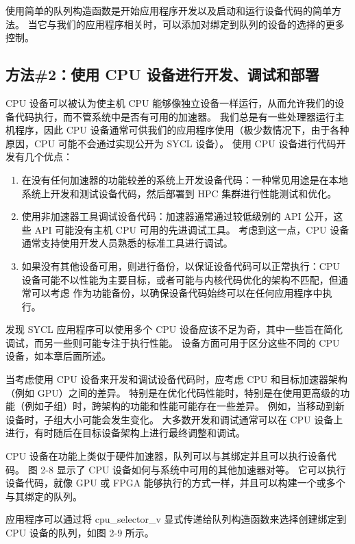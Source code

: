 使用简单的队列构造函数是开始应用程序开发以及启动和运行设备代码的简单方法。 当它与我们的应用程序相关时，可以添加对绑定到队列的设备的选择的更多控制。

\subsection{方法\#2：使用 CPU 设备进行开发、调试和部署}
CPU 设备可以被认为使主机 CPU 能够像独立设备一样运行，从而允许我们的设备代码执行，而不管系统中是否有可用的加速器。 我们总是有一些处理器运行主机程序，因此 CPU 设备通常可供我们的应用程序使用（极少数情况下，由于各种原因，CPU 可能不会通过实现公开为 SYCL 设备）。 使用 CPU 设备进行代码开发有几个优点：

\begin{enumerate}
	\item 在没有任何加速器的功能较差的系统上开发设备代码：一种常见用途是在本地系统上开发和测试设备代码，然后部署到 HPC 集群进行性能测试和优化。

	\item 使用非加速器工具调试设备代码：加速器通常通过较低级别的 API 公开，这些 API 可能没有主机 CPU 可用的先进调试工具。 考虑到这一点，CPU 设备通常支持使用开发人员熟悉的标准工具进行调试。

	\item 如果没有其他设备可用，则进行备份，以保证设备代码可以正常执行：CPU 设备可能不以性能为主要目标，或者可能与内核代码优化的架构不匹配，但通常可以考虑 作为功能备份，以确保设备代码始终可以在任何应用程序中执行。
\end{enumerate}

发现 SYCL 应用程序可以使用多个 CPU 设备应该不足为奇，其中一些旨在简化调试，而另一些则可能专注于执行性能。 设备方面可用于区分这些不同的 CPU 设备，如本章后面所述。

当考虑使用 CPU 设备来开发和调试设备代码时，应考虑 CPU 和目标加速器架构（例如 GPU）之间的差异。 特别是在优化代码性能时，特别是在使用更高级的功能（例如子组）时，跨架构的功能和性能可能存在一些差异。 例如，当移动到新设备时，子组大小可能会发生变化。 大多数开发和调试通常可以在 CPU 设备上进行，有时随后在目标设备架构上进行最终调整和调试。

CPU 设备在功能上类似于硬件加速器，队列可以与其绑定并且可以执行设备代码。 图 2-8 显示了 CPU 设备如何与系统中可用的其他加速器对等。 它可以执行设备代码，就像 GPU 或 FPGA 能够执行的方式一样，并且可以构建一个或多个与其绑定的队列。

应用程序可以通过将 cpu\_selector\_v 显式传递给队列构造函数来选择创建绑定到 CPU 设备的队列，如图 2-9 所示。

